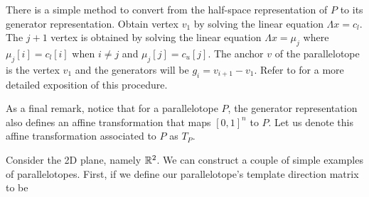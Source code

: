 There is a simple method to convert from the half-space representation of $P$ to its generator representation.
%
Obtain vertex $v_1$ by solving the linear equation $\Lambda x = c_{l}$.
%
The $j+1$ vertex is obtained by solving the linear equation $\Lambda x = \mu_{j}$ where $\mu_{j}[i] = c_{l}[i]$ when $i \neq j$ and $\mu_{j}[j] = c_{u}[j]$.
%
The anchor $v$ of the parallelotope is the vertex $v_1$ and the generators will be $g_{i} = v_{i+1} - v_{1}$. Refer to \cite{dang2014parameter} for a more detailed exposition of this procedure.

%
As a final remark, notice that for a parallelotope $P$, the generator representation also defines an affine transformation that maps $[0,1]^{n}$ to $P$.
%
Let us denote this affine transformation associated to $P$ as $T_P$.

\begin{example}
\label{ex:simple_ptope}
Consider the 2D plane, namely ${\mathbb{R}}^2$. We can construct a couple of simple examples of parallelotopes. First, if we define our parallelotope's template direction matrix to be
\end{example}


